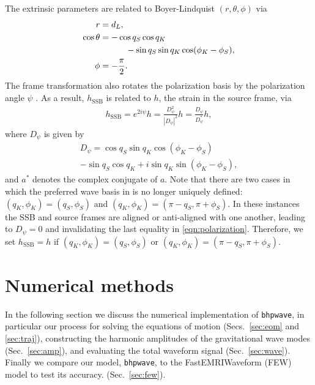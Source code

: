 \documentclass[%
 reprint,
 nofootinbib,
 amsmath,amssymb,
 aps,
 prd,
]{revtex4-2}
\begin{document}
The extrinsic parameters are related to Boyer-Lindquist $(r,\theta, \phi)$ via
\begin{subequations} \label{eqn:SSBtoSource}
    \begin{align}
        r &= d_L,
        \\
        \cos\theta &= - \cos q_S\cos q_K
        \\ \notag
        & \qquad \quad -\sin q_S \sin q_K \cos(\phi_K - \phi_S),
        \\
        \phi &= -\frac{\pi}{2}.
    \end{align}
\end{subequations}
The frame transformation also rotates the polarization basis by the polarization angle $\psi$ \cite{KatzETC21}. As a result, $h_\mathrm{SSB}$ is related to $h$, the strain in the source frame, via
\begin{align} \label{eqn:polarization}
    h_\mathrm{SSB} = e^{2i\psi} h = \frac{D_\psi^2}{|D_\psi|^2} h = \frac{D_\psi}{D^*_\psi} h,
\end{align}
where $D_\psi$ is given by
\begin{multline}
    D_\psi = \cos q_S \sin q_K \cos(\phi_K - \phi_S)
    \\ 
     - \sin q_S\cos q_K +i \sin q_K \sin(\phi_K - \phi_S),
\end{multline}
and $a^*$ denotes the complex conjugate of $a$. Note that there are two cases in which the preferred wave basis in \cite{KatzETC21} is no longer uniquely defined: $(q_K, \phi_K) = (q_S, \phi_S)$ and $(q_K, \phi_K) = (\pi - q_S, \pi + \phi_S)$. In these instances the SSB and source frames are aligned or anti-aligned with one another, leading to $D_\psi = 0$ and invalidating the last equality in \eqref{eqn:polarization}. Therefore, we set $h_\mathrm{SSB} = h$ if $(q_K, \phi_K) = (q_S, \phi_S)$ or $(q_K, \phi_K) = (\pi - q_S, \pi + \phi_S)$.



\section{Numerical methods}
\label{sec:numerical}

In the following section we discuss the numerical implementation of \texttt{bhpwave}, in particular our process for solving the equations of motion (Secs.~\ref{sec:eom} and \ref{sec:traj}), constructing the harmonic amplitudes of the gravitational wave modes (Sec.~\ref{sec:amp}), and evaluating the total waveform signal (Sec.~\ref{sec:wave}). Finally we compare our model, \texttt{bhpwave}, to the FastEMRIWaveform (FEW) model to test its accuracy. (Sec.~\ref{sec:few}).
\end{document}
